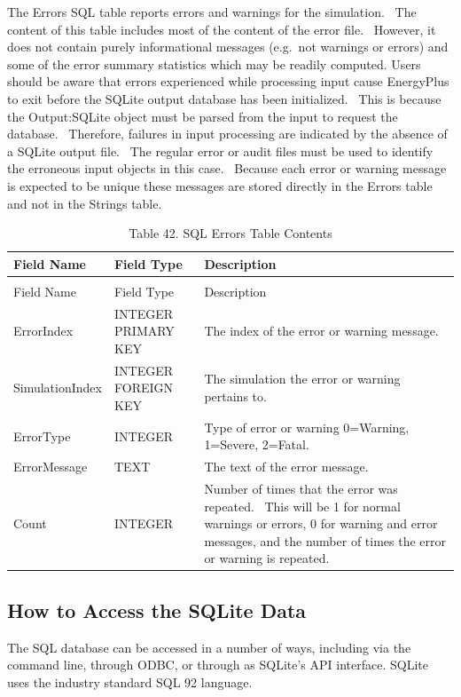 The Errors SQL table reports errors and warnings for the simulation.~ The content of this table includes most of the content of the error file.~ However, it does not contain purely informational messages (e.g.~not warnings or errors) and some of the error summary statistics which may be readily computed. Users should be aware that errors experienced while processing input cause EnergyPlus to exit before the SQLite output database has been initialized.~ This is because the Output:SQLite object must be parsed from the input to request the database.~ Therefore, failures in input processing are indicated by the absence of a SQLite output file.~ The regular error or audit files must be used to identify the erroneous input objects in this case.~ Because each error or warning message is expected to be unique these messages are stored directly in the Errors table and not in the Strings table.

\begin{longtable}[c]{p{1.5in}p{1.5in}p{2.99in}}
\caption{Table 42. SQL Errors Table Contents \label{table:table-42.-sql-errors-table-contents}} \tabularnewline
\toprule 
Field Name & Field Type & Description \tabularnewline
\midrule
\endfirsthead

\caption[]{Table 42. SQL Errors Table Contents} \tabularnewline
\toprule 
Field Name & Field Type & Description \tabularnewline
\midrule
\endhead

ErrorIndex & INTEGER PRIMARY KEY & The index of the error or warning message. \tabularnewline
SimulationIndex & INTEGER FOREIGN KEY & The simulation the error or warning pertains to. \tabularnewline
ErrorType & INTEGER & Type of error or warning 0=Warning, 1=Severe, 2=Fatal. \tabularnewline
ErrorMessage & TEXT & The text of the error message. \tabularnewline
Count & INTEGER & Number of times that the error was repeated.~ This will be 1 for normal warnings or errors, 0 for warning and error messages, and the number of times the error or warning is repeated. \tabularnewline
\bottomrule
\end{longtable}

\subsection{How to Access the SQLite Data}\label{how-to-access-the-sqlite-data}

The SQL database can be accessed in a number of ways, including via the command line, through ODBC, or through as SQLite's API interface. SQLite uses the industry standard SQL 92 language.

